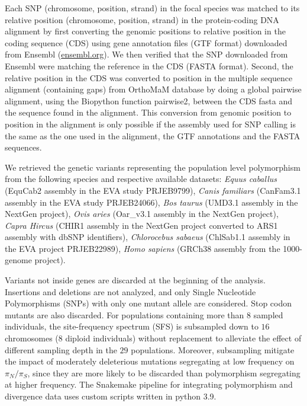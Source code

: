 \documentclass[9pt,twocolumn,twoside,lineno]{pnas-new}
\newcommand{\pn}{\pi_N}
\newcommand{\ps}{\pi_S}
\newcommand{\pnps}{\pn / \ps}
\begin{document}
{       Each SNP (chromosome, position, strand) in the focal species was matched to its relative position (chromosome, position, strand) in the protein-coding DNA alignment by first converting the genomic positions to relative position in the coding sequence (CDS) using gene annotation files (GTF format) downloaded from Ensembl (\url{ensembl.org}).
       We then verified that the SNP downloaded from Ensembl were matching the reference in the CDS (FASTA format).
       Second, the relative position in the CDS was converted to position in the multiple sequence alignment (containing gaps) from OrthoMaM database\cite{ranwez_orthomam_2007, douzery_orthomam_2014, scornavacca_orthomam_2019} by doing a global pairwise alignment, using the Biopython function pairwise2, between the CDS fasta and the sequence found in the alignment.
       This conversion from genomic position to position in the alignment is only possible if the assembly used for SNP calling is the same as the one used in the alignment, the GTF annotations and the FASTA sequences.

       We retrieved the genetic variants representing the population level polymorphism from the following species and respective available datasets: \textit{Equus caballus} (EquCab2 assembly in the EVA study PRJEB9799\cite{alabri_whole_2020}), \textit{Canis familiars} (CanFam3.1 assembly in the EVA study PRJEB24066\cite{jagannathan_comprehensive_2019}),  \textit{Bos taurus} (UMD3.1 assembly in the NextGen project), \textit{Ovis aries} (Oar\_v3.1 assembly in the NextGen project), \textit{Capra Hircus} (CHIR1 assembly in the NextGen project converted to ARS1 assembly with dbSNP identifiers\cite{sherry_dbsnp_2001}), \textit{Chlorocebus sabaeus} (ChlSab1.1 assembly in the EVA project PRJEB22989\cite{svardal_ancient_2017}), \textit{Homo sapiens} (GRCh38 assembly from the 1000-genome project\cite{consortium_integrated_2012, the1000genomesprojectconsortium_global_2015}).

       Variants not inside genes are discarded at the beginning of the analysis.
       Insertions and deletions are not analyzed, and only Single Nucleotide Polymorphisms (SNPs) with only one mutant allele are considered.
       Stop codon mutants are also discarded.
       For populations containing more than $8$ sampled individuals, the site-frequency spectrum (SFS) is subsampled down to $16$ chromosomes ($8$ diploid individuals) without replacement to alleviate the effect of different sampling depth in the $29$ populations.
       Moreover, subsampling mitigate the impact of moderately deleterious mutations segregating at low frequency on $\pnps$, since they are more likely to be discarded than polymorphism segregating at higher frequency.
       The Snakemake pipeline for integrating polymorphism and divergence data uses custom scripts written in python 3.9.

}
\end{document}
